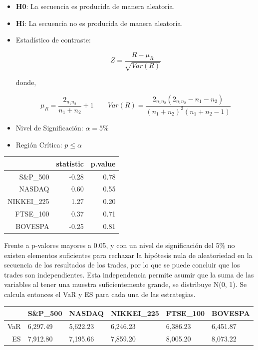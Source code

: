 \documentclass[a4paper,12pt]{Latex/Classes/PhDthesisPSnPDF}
\begin{document}
\begin{itemize}
\item \textbf{H0}: La secuencia es producida de manera aleatoria.
\item \textbf{Hi}: La secuencia no es producida de manera aleatoria.
\item Estadístico de contraste: 

$$Z = \frac{R - \mu_{R}}{\sqrt{Var(R)}}$$

donde,

$$\mu_{R} = \frac{2_{n_{1}n_{2}}}{n_{1}+n_{2}}+1  \qquad  Var(R) = \frac{2_{n_{1}n_{2}}(2_{n_{1}n_{2}}-n_{1}-n_{2})}{(n_{1}+n_{2})^{2}(n_{1}+n_{2}-1)}$$

\item Nivel de Significación: $\alpha = 5\%$
\item Región Crítica: $p \leq \alpha$
\end{itemize}

 
\begin{center}
\begin{table}[ht]
\centering
\begin{tabular}{rrr}
  \hline
 & statistic & p.value \\ 
  \hline
S\&P\_500 & -0.28 & 0.78 \\ 
  NASDAQ & 0.60 & 0.55 \\ 
  NIKKEI\_225 & 1.27 & 0.20 \\ 
  FTSE\_100 & 0.37 & 0.71 \\ 
  BOVESPA & -0.25 & 0.81 \\ 
   \hline
\end{tabular}
\end{table}\end{center}

Frente a p-valores mayores a 0.05, y con un nivel de significación del 5\% no existen elementos suficientes para rechazar la hipótesis nula de aleatoriedad en la secuencia de los resultados de los trades, por lo que se puede concluir que los trades son independientes. Esta independencia permite asumir que la suma de las variables al tener una muestra suficientemente grande, se distribuye N(0, 1). Se calcula entonces el VaR y ES para cada una de las estrategias.


\newpage
\begin{center}
\begin{table}[ht]
\centering
\begin{tabular}{rlllll}
  \hline
 & S\&P\_500 & NASDAQ & NIKKEI\_225 & FTSE\_100 & BOVESPA \\ 
  \hline
VaR & 6,297.49 & 5,622.23 & 6,246.23 & 6,386.23 & 6,451.87 \\ 
  ES & 7,912.80 & 7,195.66 & 7,859.20 & 8,005.20 & 8,073.22 \\ 
   \hline
\end{tabular}
\end{table}\end{center}
  
\end{document}
